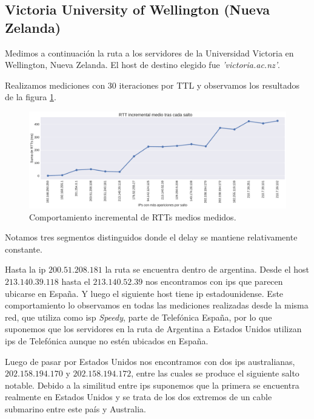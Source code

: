 \subsection{Victoria University of Wellington (Nueva Zelanda)}

Medimos a continuación la ruta a los servidores de la Universidad Victoria en Wellington, Nueva Zelanda. El host de destino elegido fue \emph{'victoria.ac.nz'}.

Realizamos mediciones con 30 iteraciones por TTL y observamos los resultados de la figura \ref{fig:victoria-incrementales}.
\\

\begin{figure}[H]
    \centering
    \includegraphics[width=1\textwidth, height=1\textheight, keepaspectratio]{../img/victoria-ac-nz-incrementales}
    \caption{Comportamiento incremental de RTTs medios medidos.}
    \label{fig:victoria-incrementales}
\end{figure}

Notamos tres segmentos distinguidos donde el delay se mantiene relativamente constante.

Hasta la ip $200.51.208.181$ la ruta se encuentra dentro de argentina.
Desde el host $213.140.39.118$ hasta el $213.140.52.39$ nos encontramos con ips que parecen ubicarse en España. Y luego el siguiente host tiene ip estadounidense.
Este comportamiento lo observamos en todas las mediciones realizadas desde la misma red, que utiliza como isp \textit{Speedy}, parte de Telefónica España, por lo que suponemos que los servidores en la ruta de Argentina a Estados Unidos utilizan ips de Telefónica aunque no estén ubicados en España.

Luego de pasar por Estados Unidos nos encontramos con dos ips australianas, $202.158.194.170$ y $202.158.194.172$, entre las cuales se produce el siguiente salto notable.
Debido a la similitud entre ips suponemos que la primera se encuentra realmente en Estados Unidos y se trata de los dos extremos de un cable submarino entre este país y Australia.

